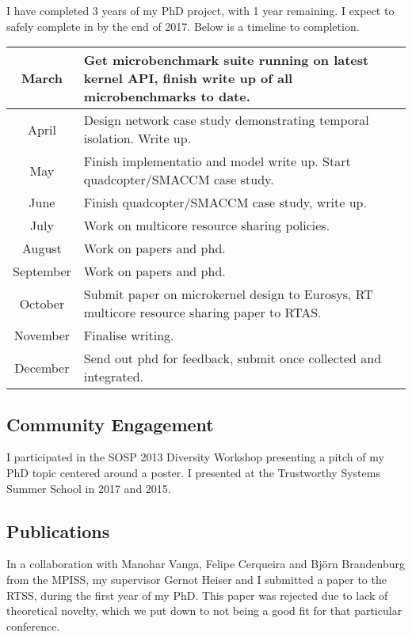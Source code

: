 I have completed 3 years of my PhD project, with 1 year remaining.
I expect to safely complete in by the end of 2017.
Below is a timeline to completion.

\begin{center}
\begin{tabular}{|c|p{}|}\hline
March & Get microbenchmark suite running on latest kernel API, finish write up of all microbenchmarks to date. \\\hline
April & Design network case study demonstrating temporal isolation. Write up. \\\hline
May & Finish implementatio and model write up. Start quadcopter/SMACCM case study. \\\hline
June & Finish quadcopter/SMACCM case study, write up. \\\hline
July & Work on multicore resource sharing policies. \\\hline
August & Work on papers and phd. \\\hline
September & Work on papers and phd. \\\hline
October & Submit paper on microkernel design to Eurosys, RT multicore resource sharing paper to RTAS. \\\hline
November & Finalise writing. \\\hline
December & Send out phd for feedback, submit once collected and integrated. \\\hline
\end{tabular}
\end{center}

\subsection{Community Engagement}

I participated in the \gls{SOSP} 2013 Diversity Workshop presenting a pitch of my PhD topic centered around a poster.
I presented at the Trustworthy Systems Summer School in 2017 and 2015.

\subsection{Publications}

In a collaboration with Manohar Vanga, Felipe Cerqueira and Bj\"{o}rn Brandenburg from the \gls{MPISS}, my supervisor Gernot Heiser and I submitted a paper to the RTSS, during the first year of my PhD.
This paper was rejected due to lack of theoretical novelty, which we put down to not being a good fit for that particular conference.

